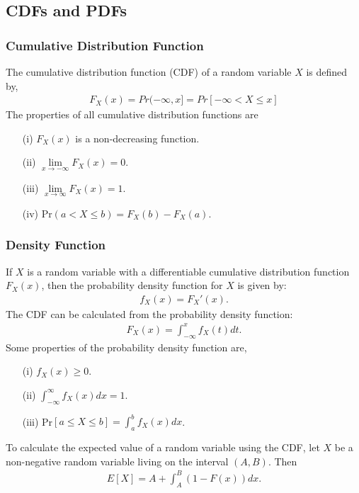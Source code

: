 \documentclass{article}
\numberwithin{theorem}{subsection}
\numberwithin{theorem}{subsubsection}
\numberwithin{lemma}{subsection}
\numberwithin{lemma}{subsubsection}
\theoremstyle{definition}
\numberwithin{definition}{subsection}
\numberwithin{definition}{subsubsection}
\begin{document}
\subsection{CDFs and PDFs}
\subsubsection{Cumulative Distribution Function}
The cumulative distribution function (CDF) of a random variable $X$ is defined by,
\begin{gather*}
    F_{X}(x) = Pr(-\infty,x] = Pr[-\infty < X \leq x]
\end{gather*}
The properties of all cumulative distribution functions are
\begin{itemize}
    \item[(i)] $F_{X}(x)$ is a non-decreasing function.
    \item[(ii)] $\lim\limits_{x\to-\infty} F_{X}(x) = 0$.
    \item[(iii)] $\lim\limits_{x\to\infty} F_{X}(x) = 1$.
    \item[(iv)] Pr$(a < X \leq b) = F_{X}(b) - F_{X}(a)$.
\end{itemize}

\subsubsection{Density Function}
If $X$ is a random variable with a differentiable cumulative distribution function $F_{X}(x)$, then the probability density function for $X$ is given by:
\begin{gather*}
    f_{X}(x) = F_{X}'(x).
\end{gather*}
The CDF can be calculated from the probability density function:
\begin{gather*}
    F_{X}(x) = \int_{-\infty}^{x}f_{X}(t)dt.
\end{gather*}
Some properties of the probability density function are,
\begin{itemize}
    \item[(i)] $f_{X}(x) \geq 0$.
    \item[(ii)] $\int_{-\infty}^{\infty} f_{X}(x)dx = 1$.
    \item[(iii)] Pr$[a \leq X \leq b] = \int_{a}^{b}f_{X}(x)dx$.
\end{itemize}

To calculate the expected value of a random variable using the CDF, let $X$ be a non-negative random variable living on the interval $(A,B)$. Then
\begin{gather}
    E[X] = A + \int_{A}^{B}(1 - F(x))dx.
\end{gather}
\end{document}
